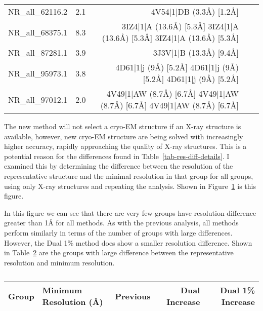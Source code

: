 \begin{table}
\begin{tabular}{llrrr}
    NR\_all\_62116.2 &  2.1  & 4V54|1|DB (3.3Å) [1.2Å]         \\
    NR\_all\_68375.1 &  8.3  & 3IZ4|1|A (13.6Å) [5.3Å]    3IZ4|1|A (13.6Å) [5.3Å] 3IZ4|1|A (13.6Å) [5.3Å] \\
    NR\_all\_87281.1 &  3.9  &     3J3V|1|B (13.3Å) [9.4Å]     \\
    NR\_all\_95973.1 &  3.8  & 4D61|1|j (9Å) [5.2Å]    4D61|1|j (9Å) [5.2Å] 4D61|1|j (9Å) [5.2Å] \\
    NR\_all\_97012.1 &  2.0  & 4V49|1|AW (8.7Å) [6.7Å]    4V49|1|AW (8.7Å) [6.7Å] 4V49|1|AW (8.7Å) [6.7Å] \\
    \bottomrule
  \end{tabular}
  \caption{}
  \label{tab:rep-res-diff-details}
\end{table}

The new method will not select a cryo-EM structure if an X-ray structure is
available, however, new cryo-EM structure are being solved with increasingly
higher accuracy, rapidly approaching the quality of X-ray structures. This is a
potential reason for the differences found in Table~\ref{tab-res-diff-details}.
I examined this by determining the difference between the resolution of the
representative structure and the minimal resolution in that group for all
groups, using only X-ray structures and repeating the analysis. Shown in
Figure~\ref{fig:xray-only-diff} is this figure.

\begin{figure}
  \caption{}
  \label{fig:xray-only-diff}
\end{figure}

In this figure we can see that there are very few groups have resolution
difference greater than 1Å for all methods. As with the previous analysis, all
methods perform similarly in terms of the number of groups with large
differences. However, the Dual 1\% method does show a smaller resolution
difference. Shown in Table~\ref{tab:xray-only-outliers} are the groups with large
difference between the representative resolution and minimum resolution.

\begin{table}
  \begin{tabular}{llrrr}
    \toprule
    Group &  Minimum Resolution (Å) &  Previous &  Dual Increase  & Dual 1\% Increase \\
    \midrule
    \bottomrule
  \end{tabular}
  \caption{}
  \label{tab:xray-only-outliers}
\end{table}

